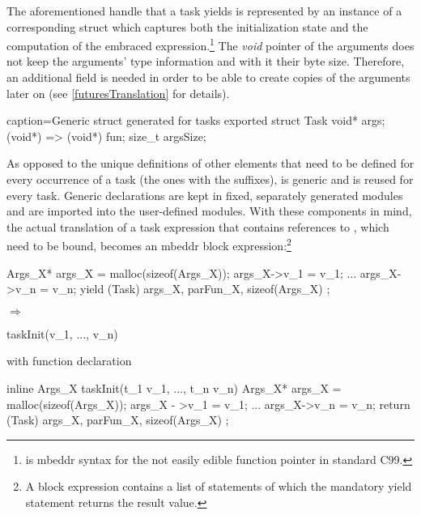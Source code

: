 The aforementioned handle that a task yields is represented by an instance of a corresponding struct which captures both the initialization state and the computation of the embraced expression.\footnote{ is mbeddr syntax for the not easily edible function pointer  in standard C99.} The \textit{void} pointer of the arguments  does not keep the arguments' type information and with it their byte size. Therefore, an additional field  is needed in order to be able to create copies of the arguments later on (see \ref{futuresTranslation} for details).
\begin{ccode}{caption=Generic struct generated for tasks}
exported struct Task {
  void* args;
  (void*) => (void*) fun;
  size_t argsSize;
}
\end{ccode}

As opposed to the unique definitions of other elements that need to be defined for every occurrence of a task (the ones with the  suffixes),  is generic and is reused for every task. Generic declarations are kept in fixed, separately generated modules and are imported into the user-defined modules.
With these components in mind, the actual translation of a task expression  that contains references  to , which need to be bound, becomes an mbeddr block expression:\footnote{A block expression contains a list of statements of which the mandatory yield statement returns the result value.}

\begin{minipage}{1\textwidth}
\begin{center}
\begin{minipage}{0.35\textwidth}
\begin{ccode}{}
{
  Args_X* args_X = 
    malloc(sizeof(Args_X));
  args_X->v_1 = v_1;
  ...
  args_X->v_n = v_n;
  yield (Task){ args_X, parFun_X, 
               sizeof(Args_X) };
}
\end{ccode}
\end{minipage}
\begin{minipage}{0.1\textwidth}
\quad$\Longrightarrow$\qquad
\end{minipage}
\begin{minipage}{0.5\textwidth}
\begin{ccode}{}
taskInit(v_1, ..., v_n)
\end{ccode}
with function declaration
\begin{ccode}{}
inline Args_X taskInit(t_1 v_1, ..., t_n v_n) {
  Args_X* args_X = malloc(sizeof(Args_X));
  args_X - >v_1 = v_1;
  ...
  args_X->v_n = v_n;
  return (Task){ args_X, parFun_X, 
                sizeof(Args_X) };
}
\end{ccode}
\end{minipage}
\end{center}
\end{minipage}
\vspace*{4mm}

